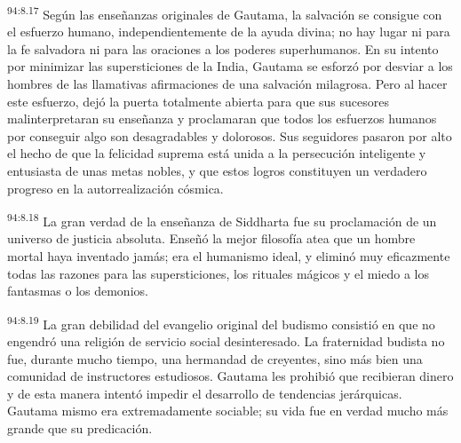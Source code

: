 \par
\textsuperscript{94:8.17} Según las enseñanzas originales de Gautama, la salvación se consigue con el esfuerzo humano, independientemente de la ayuda divina; no hay lugar ni para la fe salvadora ni para las oraciones a los poderes superhumanos. En su intento por minimizar las supersticiones de la India, Gautama se esforzó por desviar a los hombres de las llamativas afirmaciones de una salvación milagrosa. Pero al hacer este esfuerzo, dejó la puerta totalmente abierta para que sus sucesores malinterpretaran su enseñanza y proclamaran que todos los esfuerzos humanos por conseguir algo son desagradables y dolorosos. Sus seguidores pasaron por alto el hecho de que la felicidad suprema está unida a la persecución inteligente y entusiasta de unas metas nobles, y que estos logros constituyen un verdadero progreso en la autorrealización cósmica.

\par
\textsuperscript{94:8.18} La gran verdad de la enseñanza de Siddharta fue su proclamación de un universo de justicia absoluta. Enseñó la mejor filosofía atea que un hombre mortal haya inventado jamás; era el humanismo ideal, y eliminó muy eficazmente todas las razones para las supersticiones, los rituales mágicos y el miedo a los fantasmas o los demonios.

\par
\textsuperscript{94:8.19} La gran debilidad del evangelio original del budismo consistió en que no engendró una religión de servicio social desinteresado. La fraternidad budista no fue, durante mucho tiempo, una hermandad de creyentes, sino más bien una comunidad de instructores estudiosos. Gautama les prohibió que recibieran dinero y de esta manera intentó impedir el desarrollo de tendencias jerárquicas. Gautama mismo era extremadamente sociable; su vida fue en verdad mucho más grande que su predicación.

